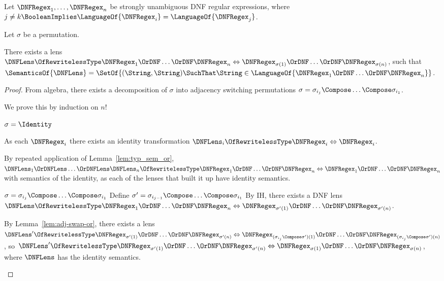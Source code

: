 \documentclass[sigplan,acmsmall]{acmart}
\begin{document}
\begin{lemma}
  \label{lem:perm-or}
  Let $\DNFRegex_1,\ldots,\DNFRegex_n$ be strongly unambiguous DNF regular
  expressions, where $j \neq k \BooleanImplies
  \LanguageOf{\DNFRegex_i} = \LanguageOf{\DNFRegex_j}$.

  Let $\sigma$ be a permutation.

  There exists a lens $\DNFLens \OfRewritelessType \DNFRegex_1 \OrDNF \ldots
  \OrDNF \DNFRegex_n \Leftrightarrow \DNFRegex_{\sigma(1)} \OrDNF \ldots
  \OrDNF \DNFRegex_{\sigma(n)}$, such that $\SemanticsOf{\DNFLens} =
  \SetOf{(\String,\String) \SuchThat \String \in \LanguageOf{\DNFRegex_1 \OrDNF
      \ldots \OrDNF \DNFRegex_n}}$.
\end{lemma}
\begin{proof}
  From algebra, there exists a decomposition of $\sigma$ into adjacency
  switching permutations $\sigma = \sigma_{i_j} \Compose \ldots \Compose
  \sigma_{i_1}$.

  We prove this by induction on $n$!

  \begin{case}[$j=0$]
    $\sigma = \Identity$

    As each $\DNFRegex_i$ there exists an identity transformation
    $\DNFLens_i \OfRewritelessType \DNFRegex_i \Leftrightarrow \DNFRegex_i$.

    By repeated application of
    Lemma~\ref{lem:typ_sem_or},
    $\DNFLens_1 \OrDNFLens \ldots \OrDNFLens \DNFLens_n \OfRewritelessType
    \DNFRegex_1 \OrDNF \ldots \OrDNF \DNFRegex_n \Leftrightarrow
    \DNFRegex_1 \OrDNF \ldots \OrDNF \DNFRegex_n$ with semantics of the
    identity, as each of the lenses that built it up have identity semantics.
  \end{case}

  \begin{case}[$j>0$]
    $\sigma = \sigma_{i_j} \Compose \ldots \Compose \sigma_{i_1}$
    Define $\sigma' = \sigma_{i_{j-1}} \Compose \ldots \Compose \sigma_{i_1}$
    By IH, there exists a DNF lens
    $\DNFLens \OfRewritelessType
    \DNFRegex_1 \OrDNF \ldots \OrDNF \DNFRegex_n
    \Leftrightarrow
    \DNFRegex_{\sigma'(1)} \OrDNF \ldots \OrDNF \DNFRegex_{\sigma'(n)}$.

    By Lemma~\ref{lem:adj-swap-or}, there exists a lens
    $\DNFLens' \OfRewritelessType
    \DNFRegex_{\sigma'(1)} \OrDNF \ldots \OrDNF \DNFRegex_{\sigma'(n)}
    \Leftrightarrow
    \DNFRegex_{(\sigma_{i_j} \Compose \sigma')(1)} \OrDNF \ldots \OrDNF
    \DNFRegex_{(\sigma_{i_j} \Compose \sigma')(n)}$,
    so 
    $\DNFLens' \OfRewritelessType
    \DNFRegex_{\sigma'(1)} \OrDNF \ldots \OrDNF \DNFRegex_{\sigma'(n)}
    \Leftrightarrow
    \DNFRegex_{\sigma(1)} \OrDNF \ldots \OrDNF \DNFRegex_{\sigma(n)}$, where
    $\DNFLens$ has the identity semantics.


\end{case}
\end{proof}
\end{document}
